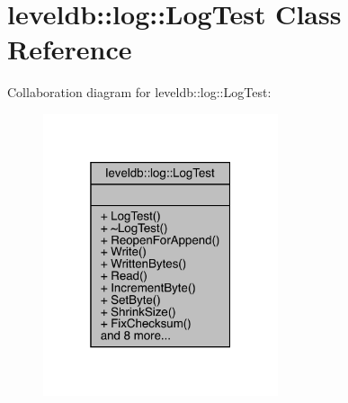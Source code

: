 \hypertarget{classleveldb_1_1log_1_1_log_test}{}\section{leveldb\+::log\+::Log\+Test Class Reference}
\label{classleveldb_1_1log_1_1_log_test}


Collaboration diagram for leveldb\+::log\+::Log\+Test\+:
\nopagebreak
\begin{figure}[H]
\begin{center}
\leavevmode
\includegraphics[width=196pt]{classleveldb_1_1log_1_1_log_test__coll__graph}
\end{center}
\end{figure}
